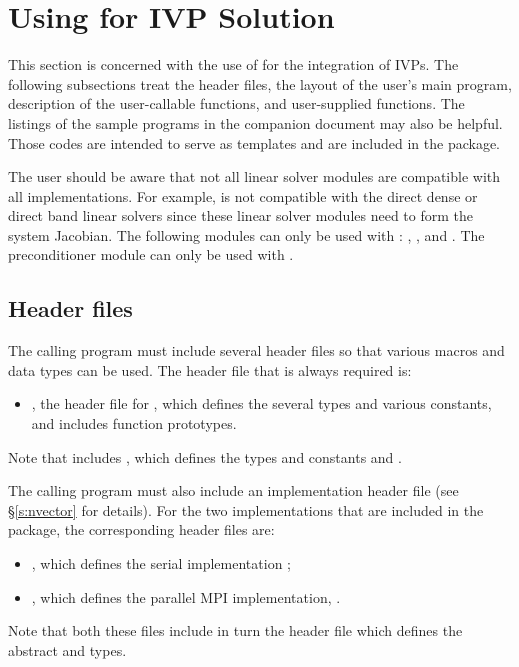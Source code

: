 \chapter{Using {\cvode} for IVP Solution}\label{s:simulation}

This section is concerned with the use of {\cvode} for the integration of IVPs.
The following subsections treat the header files, the layout of the user's main
program, description of the {\cvode} user-callable functions, and user-supplied functions. 
The listings of the sample programs in the companion document \cite{} may also be helpful. 
Those codes are intended to serve as templates and are included in the {\cvode} package.

The user should be aware that not all linear solver modules are compatible 
with all {\nvector} implementations. 
For example, {\nvecp} is not compatible with the direct dense or direct band 
linear solvers since these linear solver modules need to form the system Jacobian.
The following {\cvode} modules can only be used with {\nvecs}:
{\cvdense}, {\cvband}, and {\cvbandpre}. The preconditioner module {\cvbbdpre}
can only be used with {\nvecp}. 

\section{Header files}\label{ss:header_sim}

The calling program must include several header files so that various macros
and data types can be used. The header file that is always required is:
\begin{itemize}
\item  {}, 
  the header file for {\cvode}, which defines the several
  types and various constants, and includes function prototypes.
\end{itemize}
Note that  includes , 
which defines the types 
and constants  and .

The calling program must also include an {\nvector} implementation header file
(see \S\ref{s:nvector} for details).
For the two {\nvector} implementations that are included in the {\cvode} package,
the corresponding header files are:
\begin{itemize}
\item {}, 
  which defines the serial implementation {\nvecs};
\item {}, 
  which defines the parallel MPI implementation, {\nvecp}.
\end{itemize}
Note that both these files include in turn the header file  which 
defines the abstract  and  types. 

